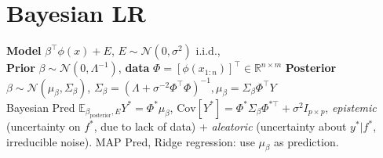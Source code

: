 \section{Bayesian LR}
\textbf{Model} $\beta^{\top}\phi(x)+E$, $E\sim\mathcal{N}(0,\sigma^2)$ i.i.d.,  \\
\textbf{Prior} $\beta\sim \mathcal{N}(0,\Lambda^{-1})$, 
\textbf{data} $\Phi=[\phi(x_{1:n})]^{\top} \in \mathbb{R}^{n\times m}$ 
\textbf{Posterior} $\beta\sim\mathcal{N}(\mu_{\beta},\Sigma_{\beta})$, $\Sigma_{\beta} = (\Lambda + \sigma^{-2}\Phi^{\top}\Phi)^{-1}, \mu_{\beta} = \Sigma_{\beta}\Phi^{\top} Y$ \\
Bayesian Pred $\mathbb{E}_{\beta_{\mathrm{posterior}},E} Y^* = \Phi^{*}\mu_{\beta}$, $\mathrm{Cov}[Y^*] = \Phi^{*}\Sigma_{\beta} \Phi^{*\top} + \sigma^{2} I_{p\times p}$, \textit{epistemic} (uncertainty on $f^*$, due to lack of data) + \textit{aleatoric} (uncertainty about $y^* | f^*$, irreducible noise).
MAP Pred, Ridge regression: use $\mu_\beta$ as prediction.